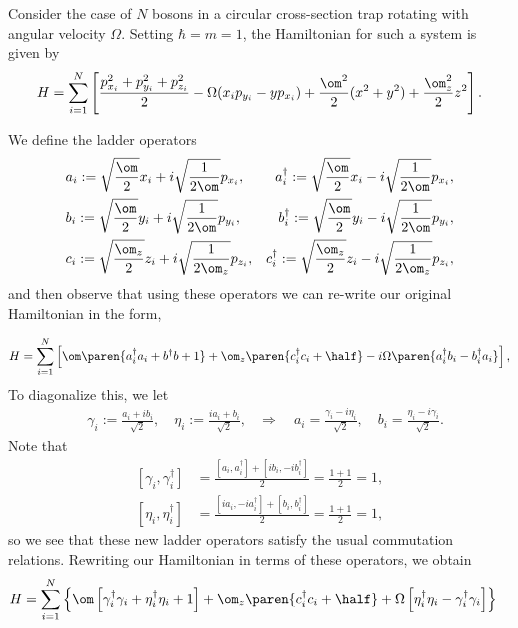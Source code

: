 \documentclass{article}
\begin{document}
Consider the case of $N$ bosons in a circular cross-section trap rotating with angular velocity $\Omega$.  Setting $\hbar=m=1$, the Hamiltonian for such a system is given by
$$H = \sum_{i=1}^N \left[\frac{p_{x_i}^2 + p_{y_i}^2 + p_{z_i}^2}{2} - \Omega(x_i
  p_{y_i} - y p_{x_i}) + \frac{\om^2}{2}(x^2+y^2) + \frac{\om_z^2}{2}z^2\right].$$

We define the ladder operators
$$
\begin{aligned}
&a_i:= \sqrt{\frac{\om}{2}}x_i + i\sqrt{\frac{1}{2\om}}p_{x_i},
&a_i^\dagger := \sqrt{\frac{\om}{2}}x_i - i\sqrt{\frac{1}{2\om}}p_{x_i},\\
&b_i:= \sqrt{\frac{\om}{2}}y_i + i\sqrt{\frac{1}{2\om}}p_{y_i},
&b_i^\dagger := \sqrt{\frac{\om}{2}}y_i - i\sqrt{\frac{1}{2\om}}p_{y_i} ,\\
&c_i:= \sqrt{\frac{\om_z}{2}}z_i + i\sqrt{\frac{1}{2\om_z}}p_{z_i},
&c_i^\dagger := \sqrt{\frac{\om_z}{2}}z_i - i\sqrt{\frac{1}{2\om_z}}p_{z_i} ,\\
\end{aligned}
$$
and then observe that using these operators we can re-write our
original Hamiltonian in the form,

$$
\begin{aligned}
H
&= \sum_{i=1}^N \left[\om\paren{a_i^\dagger a_i + b^\dagger b + 1} +  \om_z\paren{c_i^\dagger c_i + \half} - i\Omega\paren{a_i^\dagger b_i - b_i^\dagger a_i}\right],\\
\end{aligned}
$$
To diagonalize this, we let
$$
\begin{aligned}
&\gamma_i := \frac{a_i + i b_i}{\sqrt{2}}, \quad \eta_i := \frac{i a_i + b_i}{\sqrt{2}},
&\Rightarrow\quad a_i = \frac{\gamma_i - i \eta_i}{\sqrt 2}, \quad b_i =\frac{\eta_i - i \gamma_i}{\sqrt 2}.
\end{aligned}
$$
Note that
$$
\begin{aligned}
\left[\gamma_i,\gamma_i^\dagger\right] &=
  \frac{\left[a_i,a_i^\dagger\right] +
  \left[ib_i,-ib_i^\dagger\right]}{2} = \frac{1+1}{2} = 1,\\
\left[\eta_i,\eta_i^\dagger\right] &=
  \frac{\left[i a_i,-i a_i^\dagger\right] +
  \left[b_i,b_i^\dagger\right]}{2} = \frac{1+1}{2} = 1,
\end{aligned}
$$
so we see that these new ladder operators satisfy the usual
commutation relations.  Rewriting our Hamiltonian in terms of these
operators, we obtain
$$
\begin{aligned}
H
&=  \sum_{i=1}^N \left\{\om\left[\gamma_i^\dagger\gamma_i + \eta_i^\dagger\eta_i + 1\right] + \om_z\paren{c_i^\dagger c_i + \half}+ \Omega\left[\eta_i^\dagger\eta_i - \gamma_i^\dagger\gamma_i\right]\right\}
\end{aligned}
$$
\end{document}

